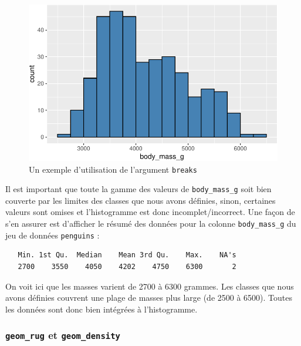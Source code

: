 \documentclass[
  a4paper,
  DIV=11,
  numbers=noendperiod,
  oneside]{scrreprt}
\newenvironment{Shaded}{}{}
\newcommand{\FunctionTok}[1]{\textcolor[rgb]{0.44,0.26,0.76}{#1}}
\newcommand{\NormalTok}[1]{\textcolor[rgb]{0.14,0.16,0.18}{#1}}
\newcommand{\SpecialCharTok}[1]{\textcolor[rgb]{0.00,0.36,0.77}{#1}}
\begin{document}
\begin{figure}[H]

{\centering \includegraphics{03-visualization_files/figure-pdf/unnamed-chunk-18-1.pdf}

}

\caption{Un exemple d'utilisation de l'argument \texttt{breaks}}

\end{figure}%

Il est important que toute la gamme des valeurs de
\texttt{body\_mass\_g} soit bien couverte par les limites des classes
que nous avons définies, sinon, certaines valeurs sont omises et
l'histogramme est donc incomplet/incorrect. Une façon de s'en assurer
est d'afficher le résumé des données pour la colonne
\texttt{body\_mass\_g} du jeu de données \texttt{penguins} :

\begin{Shaded}
\end{Shaded}

\begin{verbatim}
   Min. 1st Qu.  Median    Mean 3rd Qu.    Max.    NA's 
   2700    3550    4050    4202    4750    6300       2 
\end{verbatim}

On voit ici que les masses varient de 2700 à 6300 grammes. Les classes
que nous avons définies couvrent une plage de masses plus large (de 2500
à 6500). Toutes les données sont donc bien intégrées à l'histogramme.

\subsubsection{\texorpdfstring{\texttt{geom\_rug} et
\texttt{geom\_density}}{geom\_rug et geom\_density}}\label{geom_rug-et-geom_density}
\end{document}
